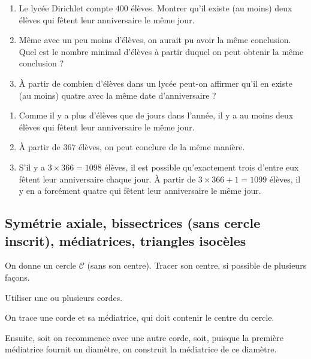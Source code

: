 \begin{exo}
\begin{enumerate}
\item
Le lycée Dirichlet compte $400$ élèves. Montrer qu'il existe (au moins) deux élèves qui fêtent leur anniversaire le même jour.

\item Même avec un peu moins d'élèves, on aurait pu avoir la même conclusion. Quel est le nombre minimal d'élèves à partir duquel on peut obtenir la même conclusion ?

\item À partir de combien d'élèves dans un lycée peut-on affirmer qu'il en existe  (au moins) quatre avec la même date d'anniversaire ?
\end{enumerate}
\begin{sol}
\begin{enumerate}
\item
Comme il y a plus d'élèves que de jours dans l'année, il y a au moins deux élèves qui fêtent leur anniversaire le même jour.

\item À partir de $367$ élèves, on peut conclure de la même manière.

\item S'il y a $3\times 366=1098$ élèves, il est possible qu'exactement trois d'entre eux fêtent leur anniversaire chaque jour. À partir de $3\times 366+1=1099$ élèves, il y en a forcément quatre qui fêtent leur anniversaire le même jour.
\end{enumerate}
\end{sol}
\end{exo}

\subsection{Symétrie axiale, bissectrices (sans cercle inscrit), médiatrices, triangles isocèles}



\begin{exo}
On donne un cercle $\mathcal C$ (sans son centre).
Tracer son centre, si possible de plusieurs façons. 
\begin{hint}
Utiliser une ou plusieurs cordes.
\end{hint}
\begin{sol}
On trace une corde et sa médiatrice, qui doit contenir le centre du cercle.

Ensuite, soit on recommence avec une autre corde, soit, puisque la première médiatrice fournit un diamètre, on construit la médiatrice de ce diamètre.
\end{sol}
\end{exo}  

